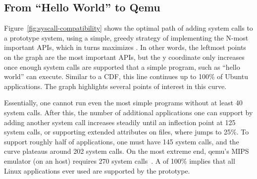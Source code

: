 

\subsection{From ``Hello World'' to Qemu}
\label{sec:observation:hello}

Figure~\ref{fig:syscall-compatibility} shows the optimal path of adding system calls to a prototype system,
using a simple, greedy strategy of implementing the N-most important APIs, which in turns
maximizes \compatmetric{}.
In other words, the leftmost points on the graph are the most important APIs,
but the y coordinate only increases once enough system calls
are supported that a simple program, such as ``hello world'' can execute. %
Similar to a CDF, this line
continues up to 100\% of Ubuntu applications.  The graph highlights several 
points of interest in this curve.

Essentially, one cannot run even the most simple programs without at least 40 system calls.
After this, the number of additional applications one can support by adding another system call increases
steadily until an inflection point at 125 system calls, or supporting extended attributes on files,
where \compatmetric{} jumps to 25\%.
To support roughly half of \osdist{} applications, one must have 145 system calls, and
the curve plateaus around 202 system calls.  
On the most extreme end, qemu's MIPS emulator (on an \osarch{} host) requires 270 system calls~\cite{Bellard05}.
A \compatmetric{} of 100\% implies that
all Linux applications ever used
are supported by the prototype.

